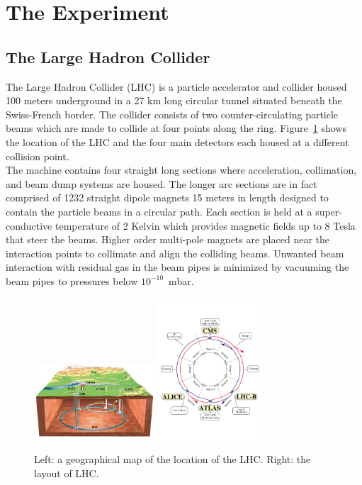 \clearpage
\section{The Experiment}

\subsection{The Large Hadron Collider\label{sec:lhc}}

The Large Hadron Collider (LHC) is a particle accelerator and collider
housed 100 meters underground in a 27 km long circular tunnel situated 
beneath the Swiss-French border. The collider consists of two 
counter-circulating particle beams which are made to collide at four points 
along the ring. Figure~\ref{fig:lhc} shows the location of the LHC and 
the four main detectors each housed at a different collision point.\\
\indent The machine contains four straight long sections where acceleration, 
collimation, and beam dump systems are housed. The longer arc sections are
in fact comprised of 1232 straight dipole magnets 15 meters in length designed to contain 
the particle beams in a circular path. Each section is held at a 
super-conductive temperature of 2 Kelvin which provides magnetic fields up to 8
Tesla that steer the beams. Higher order multi-pole magnets are 
placed near the interaction points to collimate and align the 
colliding beams. Unwanted beam interaction with residual gas in the beam pipes
is minimized by vacuuming the beam pipes to pressures below $10^{-10}$~mbar.

\begin{figure}[h!]
  \begin{center}
      \includegraphics[width=0.40\textwidth,]{figures/CERNMap.jpg}
      \includegraphics[width=0.35\textwidth,]{figures/lhc-pho-1997-060.jpg}
      \caption{\label{fig:lhc} Left: a geographical map of the location of the LHC. Right: 
      the layout of LHC.}
  \end{center}
\end{figure}

